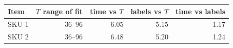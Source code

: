 \begin{tabular}{@{}lrrrr@{}}
\toprule
Item & $T$ range of fit & time vs $T$ & labels vs $T$ & time vs labels \\
\midrule
SKU 1 & 36--96 & 6.05 & 5.15 & 1.17 \\
SKU 2 & 36--96 & 6.48 & 5.20 & 1.24 \\
\bottomrule
\end{tabular}
